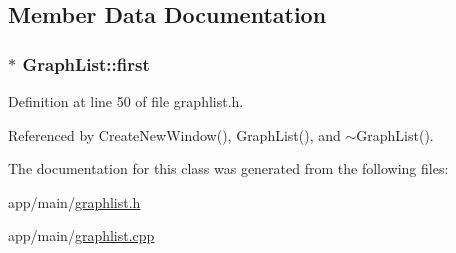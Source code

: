 \subsection{Member Data Documentation}
\subsubsection[{\texorpdfstring{first}{first}}]{$\ast$ Graph\+List\+::first\hspace{0.3cm}{\ttfamily [private]}}\hypertarget{classGraphList_ad4646aa3e159fc56cd56ff82ebb9b48b}{}\label{classGraphList_ad4646aa3e159fc56cd56ff82ebb9b48b}


Definition at line 50 of file graphlist.\+h.



Referenced by Create\+New\+Window(), Graph\+List(), and $\sim$\+Graph\+List().



The documentation for this class was generated from the following files\+:\begin{DoxyCompactItemize}
\item 
app/main/\hyperlink{graphlist_8h}{graphlist.\+h}\item 
app/main/\hyperlink{graphlist_8cpp}{graphlist.\+cpp}\end{DoxyCompactItemize}

